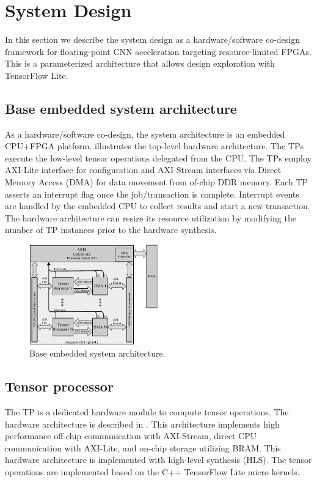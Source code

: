 \section{System Design}
\label{sec:system_design}
In this section we describe the system design as a hardware/software co-design framework for floating-point CNN acceleration targeting resource-limited FPGAs. This is a parameterized architecture that allows design exploration with TensorFlow Lite.

\subsection{Base embedded system architecture}
As a hardware/software co-design, the system architecture is an embedded CPU+FPGA platform.  illustrates the top-level hardware architecture. The TPs execute the low-level tensor operations delegated from the CPU. The TPs employ AXI-Lite interface for configuration and AXI-Stream interfaces via Direct Memory Access (DMA) for data movement from of-chip DDR memory. Each TP asserts an interrupt flag once the job/transaction is complete. Interrupt events are handled by the embedded CPU to collect results and start a new transaction. The hardware architecture can resize its resource utilization by modifying the number of TP instances prior to the hardware synthesis.
\begin{figure}[t!]
	\centering
	\includegraphics[width=0.5\textwidth]{../figures/system_design.pdf}
	\caption{Base embedded system architecture.}
	\label{fig:system_architecture}
\end{figure}
\subsection{Tensor processor}
The TP is a dedicated hardware module to compute tensor operations. The hardware architecture is described in . This architecture implements high performance off-chip communication with AXI-Stream, direct CPU communication with AXI-Lite, and on-chip storage utilizing BRAM. This hardware architecture is implemented with high-level synthesis (HLS). The tensor operations are implemented based on the C++ TensorFlow Lite micro kernels.

